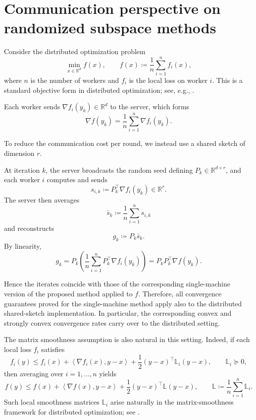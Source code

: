 \documentclass[10pt]{article}
\newcommand{\R}{\mathbb{R}}
\newcommand{\ip}[2]{\left\langle #1,#2\right\rangle}
\newcommand{\Lmat}{\mathbb{L}}
\begin{document}
\section{Communication perspective on randomized subspace methods}
\label{app:distributed-comparison}


Consider the distributed optimization problem
\[
\min_{x\in\R^d} f(x),
\qquad
f(x)\coloneqq\frac1n\sum_{i=1}^n f_i(x),
\]
where \(n\) is the number of workers and \(f_i\) is the local loss on worker \(i\).
This is a standard objective form in distributed optimization; see, e.g.,
\cite{hong2017proxpda,yang2019survey}.

Each worker sends \(\nabla f_i(y_k)\in\R^d\) to the server, which forms
\[
\nabla f(y_k)=\frac1n\sum_{i=1}^n \nabla f_i(y_k).
\]








To reduce the communication cost per round, we instead use a shared sketch of dimension \(r\).

At iteration \(k\), the server broadcasts the random seed defining \(P_k\in\R^{d\times r}\), and each worker \(i\) computes and sends
\[
s_{i,k}\coloneqq P_k^\top \nabla f_i(y_k)\in\R^r.
\]
The server then averages
\[
\bar s_k\coloneqq\frac1n\sum_{i=1}^n s_{i,k}
\]
and reconstructs
\[
g_k\coloneqq P_k\bar s_k.
\]
By linearity,
\[
g_k
=
P_k\left(\frac1n\sum_{i=1}^n P_k^\top \nabla f_i(y_k)\right)
=
P_kP_k^\top \nabla f(y_k).
\]




Hence the iterates coincide with those of the corresponding
single-machine version of the proposed method applied to \(f\).
Therefore, all convergence guarantees proved for the single-machine method
apply also to the distributed shared-sketch implementation. In particular,
the corresponding convex and strongly convex convergence rates carry over
to the distributed setting.

The matrix smoothness assumption is also natural in this setting.
Indeed, if each local loss \(f_i\) satisfies
\[
f_i(y)\le f_i(x)+\ip{\nabla f_i(x)}{y-x}
+\frac12 (y-x)^\top \Lmat_i (y-x),
\qquad
\Lmat_i\succeq 0,
\]
then averaging over \(i=1,\dots,n\) yields
\[
f(y)\le f(x)+\ip{\nabla f(x)}{y-x}
+\frac12 (y-x)^\top \Lmat (y-x),
\qquad
\Lmat\coloneqq\frac1n\sum_{i=1}^n \Lmat_i.
\]
Such local smoothness matrices \(\Lmat_i\) arise naturally in the matrix-smoothness framework for distributed optimization; see \cite{safaryan2021smoothness}.
\end{document}
